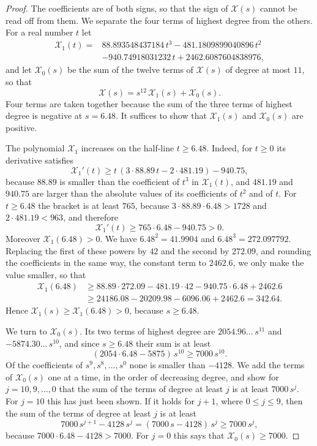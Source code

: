 \documentclass{amsart}
\theoremstyle{definition}
\theoremstyle{remark}
\numberwithin{equation}{section}
\begin{document}
\begin{proof}
The coefficients are of both signs, so that the sign of $\mathcal X(s)$
cannot be read off from them. We separate the four terms of
highest degree from the others. For a real number $t$ let
\begin{align*}
\mathcal X_1(t)={}&88.893548437184\,t^{3}-481.1809899040896\,t^{2}\\
&-940.74918031232\,t+2462.6087604838976 ,
\end{align*}
and let $\mathcal X_0(s)$ be the sum of the twelve terms of $\mathcal X(s)$
of degree at most $11$, so that
\[
\mathcal X(s)=s^{12}\,\mathcal X_1(s)+\mathcal X_0(s).
\]
Four terms are taken together because the sum of the three terms of highest
degree is negative at $s=6.48$. It suffices to show that
$\mathcal X_1(s)$ and $\mathcal X_0(s)$ are positive.

The polynomial $\mathcal X_1$ increases on the half-line $t\ge6.48$. Indeed,
for $t\ge0$ its derivative satisfies
\[
\mathcal X_1'(t)\ge t\,(3\cdot88.89\,t-2\cdot481.19)-940.75 ,
\]
because $88.89$ is smaller than the coefficient of $t^3$ in
$\mathcal X_1(t)$, and $481.19$ and $940.75$ are larger than the absolute
values of its coefficients of $t^2$ and of $t$. For $t\ge6.48$ the bracket
is at least $765$, because $3\cdot88.89\cdot6.48>1728$ and
$2\cdot481.19<963$, and therefore
\[
\mathcal X_1'(t)\ge765\cdot6.48-940.75>0 .
\]
Moreover $\mathcal X_1(6.48)>0$. We have $6.48^2=41.9904$ and
$6.48^3=272.097792$. Replacing the first of these powers by $42$ and the
second by $272.09$, and rounding the coefficients in the same way, the
constant term to $2462.6$, we only make the value smaller, so that
\begin{align*}
\mathcal X_1(6.48)
&\ge88.89\cdot272.09-481.19\cdot42-940.75\cdot6.48+2462.6\\
&\ge24186.08-20209.98-6096.06+2462.6=342.64 .
\end{align*}
Hence $\mathcal X_1(s)\ge\mathcal X_1(6.48)>0$, because $s\ge6.48$.

We turn to $\mathcal X_0(s)$. Its two terms of highest degree
are $2054.96\ldots\,s^{11}$ and $-5874.30\ldots\,s^{10}$, and since
$s\ge6.48$ their sum is at least
\[
(2054\cdot6.48-5875)\,s^{10}\ge7000\,s^{10} .
\]
Of the coefficients of $s^{9},s^{8},\dots,s^{0}$ none is smaller than
$-4128$. We add the terms of $\mathcal X_0(s)$ one at a time, in the order
of decreasing degree, and show for $j=10,9,\dots,0$ that the sum of the
terms of degree at least $j$ is at least $7000\,s^{j}$.
For $j=10$ this has just been shown. If it holds for $j+1$, where
$0\le j\le9$, then the sum of the terms of degree at least $j$ is at least
\[
7000\,s^{j+1}-4128\,s^{j}=(7000\,s-4128)\,s^{j}\ge7000\,s^{j} ,
\]
because $7000\cdot6.48-4128>7000$. For $j=0$ this says that
$\mathcal X_0(s)\ge7000$.


\end{proof}
\end{document}

